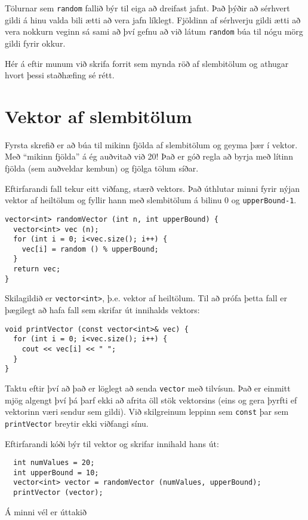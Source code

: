 Tölurnar sem {\tt random} fallið býr til eiga að dreifast jafnt.
Það þýðir að sérhvert gildi á hinu valda bili ætti að vera jafn líklegt.
Fjöldinn af sérhverju gildi ætti að vera nokkurn veginn sá sami að því gefnu að við látum {\tt random} búa til nógu mörg gildi fyrir okkur.

Hér á eftir munum við skrifa forrit sem mynda röð af slembitölum og athugar hvort þessi staðhæfing sé rétt.

\section{Vektor af slembitölum}

Fyrsta skrefið er að búa til mikinn fjölda af slembitölum og geyma þær í vektor.
Með ``mikinn fjölda'' á ég auðvitað við 20!  
Það er góð regla að byrja með lítinn fjölda (sem auðveldar kembun) og fjölga tölum síðar.

Eftirfarandi fall tekur eitt viðfang, stærð vektors.
Það úthlutar minni fyrir nýjan vektor af heiltölum og fyllir hann með slembitölum á bilinu 0 og {\tt upperBound-1}.

\begin{verbatim}
vector<int> randomVector (int n, int upperBound) {
  vector<int> vec (n);
  for (int i = 0; i<vec.size(); i++) {
    vec[i] = random () % upperBound;
  }
  return vec;
}
\end{verbatim}
%
Skilagildið er {\tt vector<int>}, þ.e. vektor af heiltölum.
Til að prófa þetta fall er þægilegt að hafa fall sem skrifar út innihalds vektors:

\begin{verbatim}
void printVector (const vector<int>& vec) {
  for (int i = 0; i<vec.size(); i++) {
    cout << vec[i] << " ";
  }
}
\end{verbatim}
%
Taktu eftir því að það er löglegt að senda {\tt vector} með tilvísun.
Það er einmitt mjög algengt því þá þarf ekki að afrita öll stök vektorsins (eins og gera þyrfti ef vektorinn væri sendur sem gildi).
Við skilgreinum leppinn sem {\tt const} þar sem {\tt printVector} breytir ekki viðfangi sínu. 

Eftirfarandi kóði býr til vektor og skrifar innihald hans út: 

\begin{verbatim}
  int numValues = 20;
  int upperBound = 10;
  vector<int> vector = randomVector (numValues, upperBound);
  printVector (vector);
\end{verbatim}
%
Á minni vél er úttakið 

